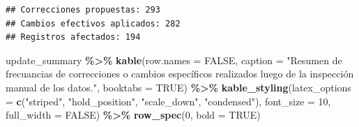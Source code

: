 \documentclass[sn-apa,pdflatex]{sn-jnl}
\newenvironment{Shaded}{\begin{snugshade}}{\end{snugshade}}
\newcommand{\AttributeTok}[1]{\textcolor[rgb]{0.13,0.29,0.53}{#1}}
\newcommand{\CommentTok}[1]{\textcolor[rgb]{0.56,0.35,0.01}{\textit{#1}}}
\newcommand{\ConstantTok}[1]{\textcolor[rgb]{0.56,0.35,0.01}{#1}}
\newcommand{\DecValTok}[1]{\textcolor[rgb]{0.00,0.00,0.81}{#1}}
\newcommand{\FunctionTok}[1]{\textcolor[rgb]{0.13,0.29,0.53}{\textbf{#1}}}
\newcommand{\NormalTok}[1]{#1}
\newcommand{\SpecialCharTok}[1]{\textcolor[rgb]{0.81,0.36,0.00}{\textbf{#1}}}
\newcommand{\StringTok}[1]{\textcolor[rgb]{0.31,0.60,0.02}{#1}}
\begin{document}
\begin{Shaded}
\end{Shaded}

\begin{verbatim}
## Correcciones propuestas: 293
## Cambios efectivos aplicados: 282
## Registros afectados: 194
\end{verbatim}

\begin{Shaded}
\begin{Highlighting}[]
\NormalTok{update\_summary }\SpecialCharTok{\%\textgreater{}\%}
    \FunctionTok{kable}\NormalTok{(}\AttributeTok{row.names =} \ConstantTok{FALSE}\NormalTok{, }\AttributeTok{caption =} \StringTok{"Resumen de frecuancias de correcciones o cambios  específicos realizados luego de la inspección manual de los datos."}\NormalTok{,}
        \AttributeTok{booktabs =} \ConstantTok{TRUE}\NormalTok{) }\SpecialCharTok{\%\textgreater{}\%}
    \FunctionTok{kable\_styling}\NormalTok{(}\AttributeTok{latex\_options =} \FunctionTok{c}\NormalTok{(}\StringTok{"striped"}\NormalTok{, }\StringTok{"hold\_position"}\NormalTok{,}
        \StringTok{"scale\_down"}\NormalTok{, }\StringTok{"condensed"}\NormalTok{), }\AttributeTok{font\_size =} \DecValTok{10}\NormalTok{, }\AttributeTok{full\_width =} \ConstantTok{FALSE}\NormalTok{) }\SpecialCharTok{\%\textgreater{}\%}
    \FunctionTok{row\_spec}\NormalTok{(}\DecValTok{0}\NormalTok{, }\AttributeTok{bold =} \ConstantTok{TRUE}\NormalTok{)}
\end{Highlighting}
\end{Shaded}
\end{document}
